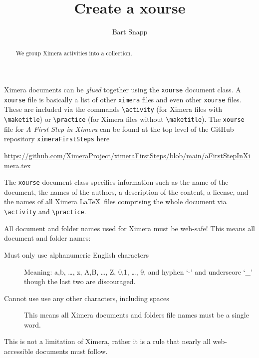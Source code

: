 \documentclass{ximera}
\title{Create a xourse}
\author{Bart Snapp}
\begin{document}
\begin{abstract}
  We group Ximera activities into a collection.
\end{abstract}
\maketitle


Ximera documents can be \textit{glued} together using the \texttt{xourse}
document class. A \verb|xourse| file is basically a list of other \verb|ximera|
files and even
other \verb|xourse| files. These are included via the commands \verb!\activity!
(for Ximera files with \verb!\maketitle!) or \verb!\practice! (for Ximera files
without \verb!\maketitle!). The \verb|xourse| file for \textit{A First Step in
  Ximera} can be found at the top level of the GitHub repository
\verb!ximeraFirstSteps! here
\begin{center}

  \url{https://github.com/XimeraProject/ximeraFirstSteps/blob/main/aFirstStepInXimera.tex}
\end{center}
The \verb!xourse! document class specifies information such as the name of the
document, the names of the authors, a description of the content, a license,
and
the names of all Ximera \LaTeX\ files comprising
the whole document via \verb!\activity! and \verb!\practice!.

\begin{warning}
  All document and folder names used for Ximera must be web-safe! This means
  all document and folder names:
  \begin{description}
    \item[Must only use alphanumeric English characters] Meaning: a,b, \dots,
      z, A,B, \dots, Z, 0,1, \dots, 9, and hyphen `-' and underscore `\_'
      though the
      last two are discouraged.
    \item[Cannot use use any other characters, including spaces] This means all
      Ximera documents and folders file names must be a single word.
  \end{description}
  This is not a limitation of Ximera, rather it is a rule that nearly all
  web-accessible documents must follow.
\end{warning}
\end{document}
